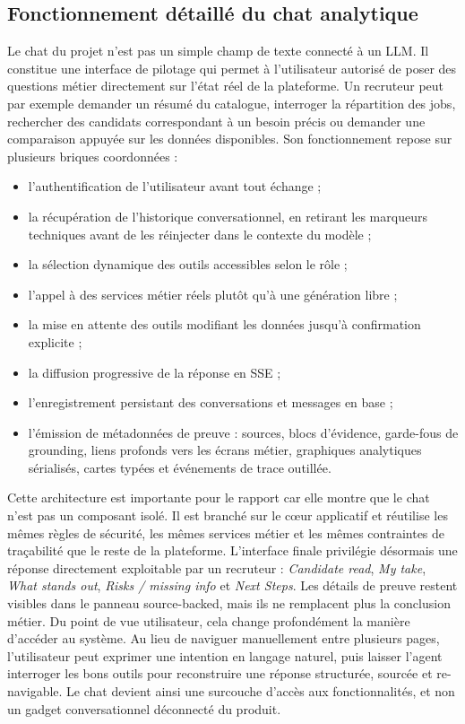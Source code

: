 \subsection{Fonctionnement détaillé du chat analytique}
Le chat du projet n'est pas un simple champ de texte connecté à un LLM. Il constitue une interface de pilotage qui permet à l'utilisateur autorisé de poser des questions métier directement sur l'état réel de la plateforme. Un recruteur peut par exemple demander un résumé du catalogue, interroger la répartition des jobs, rechercher des candidats correspondant à un besoin précis ou demander une comparaison appuyée sur les données disponibles.
Son fonctionnement repose sur plusieurs briques coordonnées :
\begin{itemize}
  \item l'authentification de l'utilisateur avant tout échange ;
  \item la récupération de l'historique conversationnel, en retirant les marqueurs techniques avant de les réinjecter dans le contexte du modèle ;
  \item la sélection dynamique des outils accessibles selon le rôle ;
  \item l'appel à des services métier réels plutôt qu'à une génération libre ;
  \item la mise en attente des outils modifiant les données jusqu'à confirmation explicite ;
  \item la diffusion progressive de la réponse en SSE ;
  \item l'enregistrement persistant des conversations et messages en base ;
  \item l'émission de métadonnées de preuve : sources, blocs d'évidence, garde-fous de grounding, liens profonds vers les écrans métier, graphiques analytiques sérialisés, cartes typées et événements de trace outillée.
\end{itemize}
Cette architecture est importante pour le rapport car elle montre que le chat n'est pas un composant isolé. Il est branché sur le c\oe{}ur applicatif et réutilise les mêmes règles de sécurité, les mêmes services métier et les mêmes contraintes de traçabilité que le reste de la plateforme. L'interface finale privilégie désormais une réponse directement exploitable par un recruteur : \textit{Candidate read}, \textit{My take}, \textit{What stands out}, \textit{Risks / missing info} et \textit{Next Steps}. Les détails de preuve restent visibles dans le panneau source-backed, mais ils ne remplacent plus la conclusion métier.
Du point de vue utilisateur, cela change profondément la manière d'accéder au système. Au lieu de naviguer manuellement entre plusieurs pages, l'utilisateur peut exprimer une intention en langage naturel, puis laisser l'agent interroger les bons outils pour reconstruire une réponse structurée, sourcée et re-navigable. Le chat devient ainsi une surcouche d'accès aux fonctionnalités, et non un gadget conversationnel déconnecté du produit.

